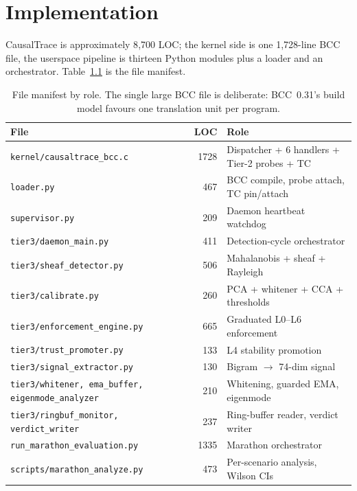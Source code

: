 \chapter{Implementation}
\label{Chapter5}

CausalTrace is approximately 8{,}700 LOC; the kernel side is one 1{,}728-line
BCC file, the userspace pipeline is thirteen Python modules plus a loader
and an orchestrator. Table~\ref{tab:file-manifest} is the file manifest.

\begin{table}[h]
\centering
\caption[Source-tree file manifest]{File manifest by role. The single large
BCC file is deliberate: BCC~0.31's build model favours one translation unit
per program.}
\label{tab:file-manifest}
\footnotesize
\setlength\tabcolsep{3pt}
\begin{tabular}{@{}l r p{6.0cm}@{}}
\toprule
File & LOC & Role \\
\midrule
\texttt{kernel/causaltrace\_bcc.c}     & 1728 & Dispatcher + 6 handlers + Tier-2 probes + TC \\
\texttt{loader.py}                     &  467 & BCC compile, probe attach, TC pin/attach \\
\texttt{supervisor.py}                 &  209 & Daemon heartbeat watchdog \\
\texttt{tier3/daemon\_main.py}         &  411 & Detection-cycle orchestrator \\
\texttt{tier3/sheaf\_detector.py}      &  506 & Mahalanobis + sheaf + Rayleigh \\
\texttt{tier3/calibrate.py}            &  260 & PCA + whitener + CCA + thresholds \\
\texttt{tier3/enforcement\_engine.py}  &  665 & Graduated L0--L6 enforcement \\
\texttt{tier3/trust\_promoter.py}      &  133 & L4 stability promotion \\
\texttt{tier3/signal\_extractor.py}    &  130 & Bigram $\to$ 74-dim signal \\
\texttt{tier3/whitener, ema\_buffer,}\newline
\texttt{\phantom{tier3/}eigenmode\_analyzer}
                                       &  210 & Whitening, guarded EMA, eigenmode \\
\texttt{tier3/ringbuf\_monitor,}\newline
\texttt{\phantom{tier3/}verdict\_writer}
                                       &  237 & Ring-buffer reader, verdict writer \\
\texttt{run\_marathon\_evaluation.py}  & 1335 & Marathon orchestrator \\
\texttt{scripts/marathon\_analyze.py}  &  473 & Per-scenario analysis, Wilson CIs \\
\bottomrule
\end{tabular}
\end{table}

